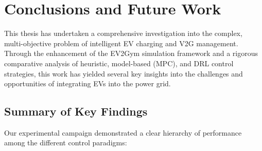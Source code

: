 \chapter{Conclusions and Future Work}
\label{chap:conclusions}

This thesis has undertaken a comprehensive investigation into the complex, multi-objective problem of intelligent EV charging and V2G management. Through the enhancement of the EV2Gym simulation framework and a rigorous comparative analysis of heuristic, model-based (MPC), and DRL control strategies, this work has yielded several key insights into the challenges and opportunities of integrating EVs into the power grid.

\section{Summary of Key Findings}

Our experimental campaign demonstrated a clear hierarchy of performance among the different control paradigms:

